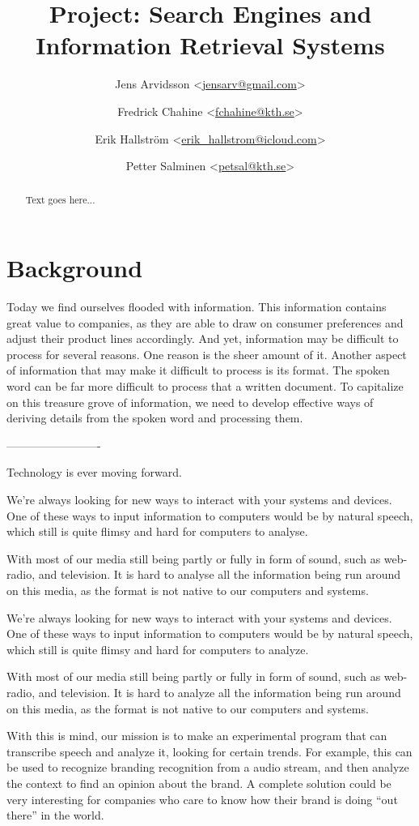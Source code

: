 \documentclass[a4paper,12pt,twoside]{ltxdoc}
\title{Project: Search Engines and Information Retrieval Systems}
\author{
Jens Arvidsson <\href{mailto:jensarv@gmail.com}{jensarv@gmail.com}> \and
Fredrick Chahine <\href{mailto:fchahine@kth.se}{fchahine@kth.se}> \and
Erik Hallström  <\href{mailto:erik_hallstrom@icloud.com}{erik\_hallstrom@icloud.com}> \and
Petter Salminen <\href{mailto:petsal@kth.se}{petsal@kth.se}>}
\begin{document}
\maketitle
\tableofcontents

\newpage
\begin{abstract}
Text goes here...

\end{abstract}

\newpage
\section{Background}
Today we find ourselves flooded with information. This information contains great value to companies, as they are
able to draw on consumer preferences and adjust their product lines accordingly. And yet, information may be difficult
to process for several reasons. One reason is the sheer amount of it. Another aspect of information that may make it difficult
to process is its format. The spoken word can be far more difficult to process that a written document. To capitalize on this treasure
grove of information, we need to develop effective ways of deriving details from the spoken word and processing them.

-------------------------

Technology is ever moving forward.

We're always looking for new ways to interact with your systems and devices. One of these ways to input information to computers would be by natural speech, which still is quite flimsy and hard for computers to analyse. 

With most of our media still being partly or fully in form of sound, such as web-radio, and television. It is hard to analyse all the information being run around on this media, as the format is not native to our computers and systems. 

We're always looking for new ways to interact with your systems and devices.
One of these ways to input information to computers would be by natural speech,
which still is quite flimsy and hard for computers to analyze. 

With most of our media still being partly or fully in form of sound, such  as web-radio, and television.
It is hard to analyze all the information being run around on this media, as the format is not
native to our computers and systems. 

With this is mind, our mission is to make an experimental program that can transcribe speech and analyze it, looking for certain trends.
For example, this can be used to recognize branding recognition from a audio stream, and then analyze the context to find an opinion about the brand.
A complete solution could be very interesting for companies who care to know how their brand is doing ``out there'' in the world.
\end{document}
